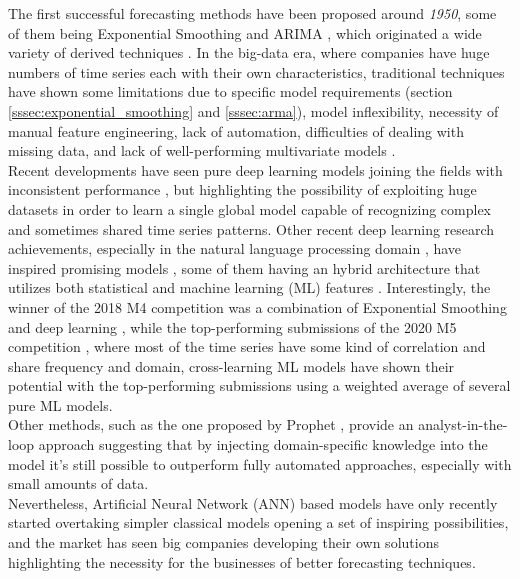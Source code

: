 \documentclass[a4paper]{article} %
\begin{document}
	The first successful forecasting methods have been proposed around \textit{1950}, some of them being Exponential Smoothing \cite{ExponentialSmoothingHoltCharles} and ARIMA \cite{ForecastingBoxJenkins}, which originated a wide variety of derived techniques \cite{25YearsForecasting}. In the big-data era, where companies have huge numbers of time series each with their own characteristics, traditional techniques have shown some limitations due to specific model requirements (section \ref{sssec:exponential_smoothing} and \ref{sssec:arma}), model inflexibility, necessity of manual feature engineering, lack of automation, difficulties of dealing with missing data, and lack of well-performing multivariate models \cite{25YearsForecasting}.\\
	Recent developments have seen pure deep learning models joining the fields with inconsistent performance \cite{DeepLearningForecastingSurvey}, but highlighting the possibility of exploiting huge datasets in order to learn a single global model capable of recognizing complex and sometimes shared time series patterns. Other recent deep learning research achievements, especially in the natural language processing domain \cite{RNNLSTM, seq2seq, EncoderDecoder}, have inspired promising models \cite{DeepAR, DeepState, DeepLearningForecastingSurvey}, some of them having an hybrid architecture that utilizes both statistical and machine learning (ML) features \cite{MAKRIDAKIS2018802, GluonTS}. 
	Interestingly, the winner of the 2018 M4 competition \cite{MAKRIDAKIS2018802} was a combination of Exponential Smoothing and deep learning \cite{UberHybridES}, while the top-performing submissions of the 2020 M5 competition \cite{M5Competition}, where most of the time series have some kind of correlation and share frequency and domain, cross-learning ML models have shown their potential with the top-performing submissions using a weighted average of several pure ML models.\\
	Other methods, such as the one proposed by Prophet \cite{FacebookProphet}, provide an analyst-in-the-loop approach suggesting that by injecting domain-specific knowledge into the model it's still possible to outperform fully automated approaches, especially with small amounts of data.\\
	Nevertheless, Artificial Neural Network (ANN) based models have only recently started overtaking simpler classical models \cite{MAKRIDAKIS2018802, M5Competition} opening a set of inspiring possibilities, and the market has seen big companies developing their own solutions \cite{FacebookProphet, GluonTS, MicrosoftSSA, UberHybridES} highlighting the necessity for the businesses of better forecasting techniques.
	
\end{document}
